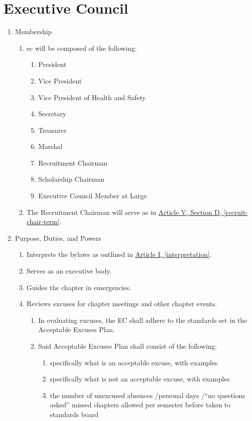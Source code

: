 \section{Executive Council}
	\begin{enumerate}
		\item Membership
			\begin{enumerate}
				\item \Gls{ec} will be composed of the following:
					\begin{enumerate}
						\item President
						\item Vice President
						\item Vice President of Health and Safety
						\item Secretary
						\item Treasurer
						\item Marshal
						\item Recruitment Chairman
                        \item Scholarship Chairman
						\item Executive Council Member at Large
					\end{enumerate}
				\item The Recruitment Chairman will serve as in \hyperref[recruit-chair-term]{Article V, Section D, \autoref*{recruit-chair-term}}.

			\end{enumerate}

		\item Purpose, Duties, and Powers
			\begin{enumerate}
				\item Interprets the bylaws as outlined in \hyperref[interpretation]{Article I, \autoref*{interpretation}}.
				\item Serves as an executive body.
				\item Guides the chapter in emergencies.
				\item Reviews excuses for chapter meetings and other chapter events.
					\begin{enumerate}
					\item In evaluating excuses, the EC shall adhere to the standards set in the
					Acceptable Excuses Plan.
					\item Said Acceptable Excuses Plan shall consist of the following:
						\begin{enumerate}
							\item specifically what is an acceptable excuse, with examples
							\item specifically what is not an acceptable excuse, with examples
							\item the number of unexcused absences \slash personal days \slash “no questions asked” missed chapters allowed per semester before taken to standards board
						\end{enumerate}


\end{enumerate}
\end{enumerate}
\end{enumerate}

